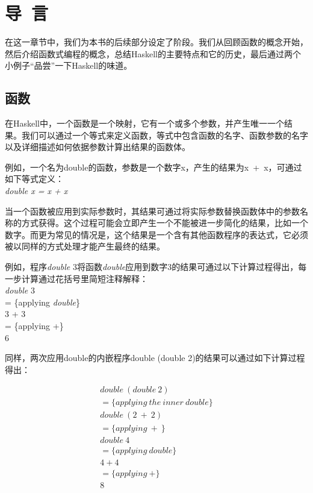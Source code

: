 
\chapter{导~言}
在这一章节中，我们为本书的后续部分设定了阶段。我们从回顾函数的概念开始，然后介绍函数式编程的概念，总结Haskell的主要特点和它的历史，最后通过两个小例子“品尝”一下Haskell的味道。

\section{函数}
在Haskell中，一个函数是一个映射，它有一个或多个参数，并产生唯一一个结果。我们可以通过一个等式来定义函数，等式中包含函数的名字、函数参数的名字以及详细描述如何依据参数计算出结果的函数体。

例如，一个名为double的函数，参数是一个数字x，产生的结果为x~+~x，可通过如下等式定义：\\
\hspace*{1cm} \textit{double x = x + x}

当一个函数被应用到实际参数时，其结果可通过将实际参数替换函数体中的参数名称的方式获得。这个过程可能会立即产生一个不能被进一步简化的结果，比如一个数字。而更为常见的情况是，这个结果是一个含有其他函数程序的表达式，它必须被以同样的方式处理才能产生最终的结果。

例如，程序\textit{double} 3将函数\textit{double}应用到数字3的结果可通过以下计算过程得出，每一步计算通过花括号里简短注释解释：\\
\hspace*{1cm} \textit{double} 3\\ 
\hspace*{1cm} = \{applying \textit{double}\} \\
\hspace*{1cm} 3 + 3\\
\hspace*{1cm} = \{applying +\}\\
\hspace*{1cm} 6 

同样，两次应用double的内嵌程序double (double 2)的结果可以通过如下计算过程得出：

\[ \begin{split}
double~(double~2)\\
= \{applying~the~inner~double\}\\
double~(2~+~2)\\
= \{applying~+~\}\\
double~4\\
= \{applying~double \}\\
4+4\\
= \{applying~+\}\\
8
\end{split} \]

